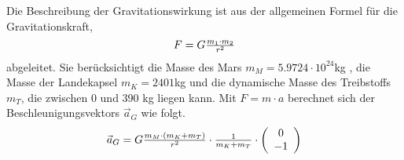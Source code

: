 Die Beschreibung der Gravitationswirkung ist aus der allgemeinen Formel für die Gravitationskraft,
\begin{equation}
	$$F = G \frac{m_1 \cdot m_2}{r^{2}} $$
\end{equation}
abgeleitet. Sie berücksichtigt die Masse des Mars $m_M = 5.9724 \cdot 10^{24}$kg \cite{NASA2016}, die Masse der Landekapsel $m_K = 2401$kg \cite{Wikipedia2016b} und die dynamische Masse des Treibstoffs $m_T$, die zwischen 0 und 390 kg \cite{Wikipedia2016b} liegen kann. Mit $F = m \cdot a$ berechnet sich der Beschleunigungsvektors $\vec a_G$ wie folgt.
\begin{equation}
	$$\vec a_G = G \frac{m_M \cdot (m_K + m_T)}{r^{2}} \cdot \frac{1}{m_K + m_T} \cdot \left(\begin{array}{c} 0 \\ -1 \end{array}\right)$$\\
\end{equation}